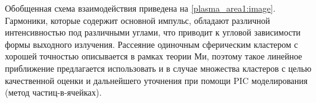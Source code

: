 Обобщенная схема взаимодействия приведена на \autoref{plasma_area1:image}. Гармоники, которые содержит основной импульс, обладают различной интенсивностью под различными углами, что приводит к угловой зависимости формы выходного излучения. Рассеяние одиночным сферическим кластером с хорошей точностью описывается в рамках теории Ми, поэтому такое линейное приближение предлагается использовать и в случае множества кластеров с целью качественной оценки и дальнейшего уточнения при помощи PIC моделирования (метод частиц-в-ячейках).

